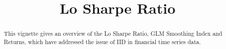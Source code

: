 \documentclass[12pt,letterpaper,english]{article}
\begin{document}


\title{ Lo Sharpe Ratio }


\makeatletter
\makeatother
\maketitle

\begin{abstract}

    This vignette gives an overview of the Lo Sharpe Ratio, GLM Smoothing Index and Returns, which have addressed the issue of IID in financial time series data.
\end{abstract}
\end{document}
